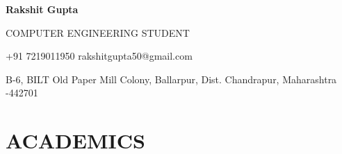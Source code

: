 \documentclass[11pt]{article} %
\newcommand{\NewPart}[1]{\section*{\uppercase{#1}}}
\begin{document}


\centerline{{\Huge \sc \textbf {Rakshit Gupta} }}  %
\centerline{\fontsize{6}{6}\selectfont COMPUTER ENGINEERING STUDENT}
\centerline{+91 7219011950 \textbullet \hspace{5pt}rakshitgupta50@gmail.com \textbullet \hspace{5pt} }
\centerline{B-6, BILT Old Paper Mill Colony, Ballarpur, Dist. Chandrapur, Maharashtra -442701}
\noindent



\NewPart{ Academics}{}
\end{document}
